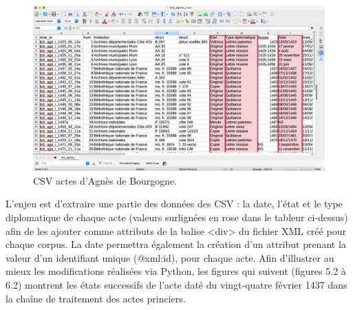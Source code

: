 \begin{figure}[ht]
    \centering
    \includegraphics[scale=0.31]{img/csv_ad.png}
    \caption{CSV actes d'Agnès de Bourgogne.}
    \label{fig:csv}
\end{figure}

\par L’enjeu est d’extraire une partie des données des CSV : la date, l'état et le type diplomatique de chaque acte (valeurs surlignées en rose dans le tableur ci-dessus) afin de les ajouter comme attributs de la balise <div> du fichier XML créé pour chaque corpus. La date permettra également la création d'un attribut prenant la valeur d'un identifiant unique (@xml:id), pour chaque acte. Afin d'illustrer au mieux les modifications réalisées via Python, les figures qui suivent (figures 5.2 à 6.2) montrent les états successifs de l'acte daté du vingt-quatre février 1437 dans la chaîne de traitement des actes princiers.
\newpage 

